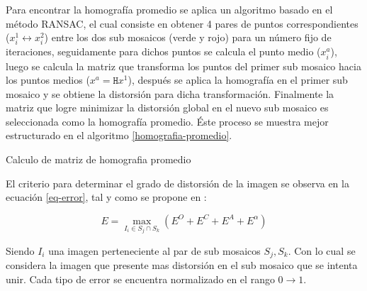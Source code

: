 Para encontrar la homografía promedio se aplica un algoritmo basado en el método RANSAC, el cual consiste en obtener 4 pares de puntos correspondientes ($x^1_i   \leftrightarrow x^2_i$) entre los dos sub mosaicos (verde y rojo) para un número fijo de iteraciones, seguidamente para dichos puntos se calcula el punto medio ($x^a_i$), luego se calcula la matriz que transforma los puntos del primer sub mosaico hacia los puntos medios ($x^a = \mathtt{H}x^1$), después se aplica la homografía en el primer sub mosaico y se obtiene la distorsión para dicha transformación. Finalmente la matriz que logre minimizar la distorsión global en el nuevo sub mosaico es seleccionada como la homografía promedio. Éste proceso se muestra mejor estructurado en el algoritmo \ref{homografia-promedio}.


\begin{spacing}{0.8}
	\begin{algorithm}[h] %
		\caption{Calculo de matriz de homografia promedio}
		\label{homografia-promedio}
		\SetAlgoLined
\end{algorithm}
\end{spacing}

El criterio para determinar el grado de distorsión de la imagen se observa en la ecuación \ref{eq-error}, tal y como se propone en \cite{bellavia-ref}:

\begin{equation}
E = \max\limits_{I_i\in S_j\cap S_k} (E^O + E^C + E^A + E^\alpha)
\label{eq-error}
\end{equation}


Siendo $I_i$ una imagen perteneciente al par de sub mosaicos $S_j,S_k$. Con lo cual se considera la imagen que presente mas distorsión en el sub mosaico que se intenta unir. Cada tipo de error se encuentra normalizado en el rango $0\to 1$. 

